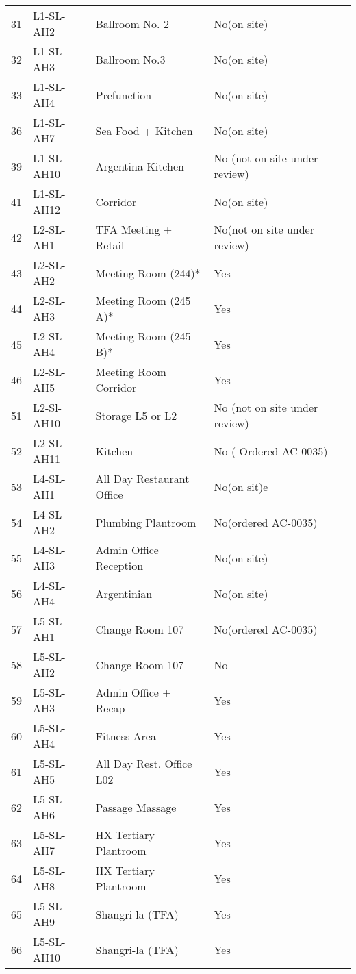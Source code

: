 \begin{table}[htbp]
\begin{tabular}{llp{3.2cm}p{3.0cm}l}
 31	 	 &L1-SL-AH2	 &Ballroom No. 2	 	& No(on site) &\ahufour\\
 32	 	 &L1-SL-AH3	 &Ballroom No.3	 	&No(on site)  &\ahufour\\
 33	 	 &L1-SL-AH4	 &Prefunction	 	 	&No(on site) &\ahufour\\
 
 36	 	 &L1-SL-AH7	 &Sea Food + Kitchen	 	& No(on site) &\ahufour\\
 
 39	 	 &L1-SL-AH10	 &Argentina Kitchen	 	&No (not on site under review) &\ahulate\\
 
 41	 	 &L1-SL-AH12	 &Corridor	 	 	& No(on site) &\ahulate\\
\midrule

 42	 	 &L2-SL-AH1	 &TFA Meeting + Retail	&No(not on site under review) &\ahulate\\
 43	 	 &L2-SL-AH2	 &Meeting Room (244)*	& Yes	 &\ahufour\\
 44	 	 &L2-SL-AH3	 &Meeting Room (245 A)*	 &Yes	 &\ahufour\\
 45	 	 &L2-SL-AH4	 &Meeting Room (245 B)*	 & Yes &\ahufour\\
 46	 	 &L2-SL-AH5	 &Meeting Room Corridor	 & Yes	 &\ahufour\\

 51	 	 &L2-Sl-AH10	 &Storage L5 or L2	 	&No (not on site under review) &\ahulate\\
 52	 	 &L2-SL-AH11	 &Kitchen	 	 	&No ( Ordered	 AC-0035)  &\ahulate\\
\midrule 

53	  	 &L4-SL-AH1	 &All Day Restaurant Office	&  No(on sit)e   &\\
 54	 	 &L4-SL-AH2	 &Plumbing Plantroom	 	&  No(ordered	 AC-0035) &\\
 55	 	 &L4-SL-AH3	 &Admin Office Reception	 & No(on site) &\\
 56	 	 &L4-SL-AH4	 &Argentinian	 	 	 &No(on site) &\\
\midrule 

57	 	 &L5-SL-AH1	 &Change Room 107	 	 &No(ordered AC-0035) &\ahunovone\\
 58	 	 &L5-SL-AH2	 &Change Room 107	 	 &No	 &\ahunovone \\
 59	 	 &L5-SL-AH3	 &Admin Office + Recap	 &Yes	 &\\
 60	 	 &L5-SL-AH4	 &Fitness Area	  		 &Yes	 &\\
 61	 	 &L5-SL-AH5	 &All Day Rest. Office L02	 &Yes	 &\\
 62	 	 &L5-SL-AH6	 &Passage Massage	 	 &Yes	 &\\
 63	 	 &L5-SL-AH7	 &HX Tertiary Plantroom	 &Yes	 &\\
 64	 	 &L5-SL-AH8	 &HX Tertiary Plantroom	 &Yes	 &\\
 65	 	 &L5-SL-AH9	 &Shangri-la (TFA)	 	 &Yes	 &\\
 66	 	 &L5-SL-AH10	 &Shangri-la (TFA)	 	 &Yes	 &\\



\end{tabular}
\end{table}
